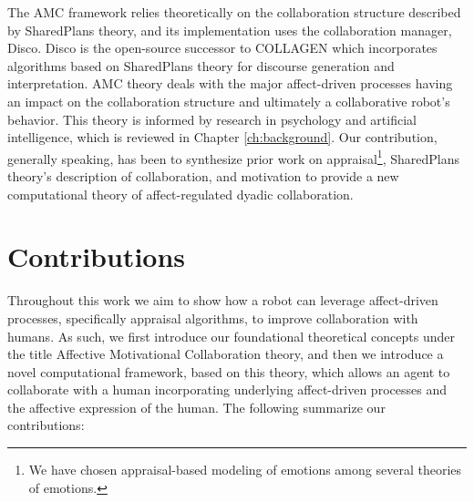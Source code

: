 \documentclass[12pt]{report}
\begin{document}
The AMC framework relies theoretically on the collaboration structure described
by SharedPlans theory, and its implementation uses the collaboration
manager, Disco. Disco is the open-source successor to COLLAGEN
\cite{rich:collaboration-manager,rich:discourse} which incorporates algorithms
based on SharedPlans theory for discourse generation and interpretation. AMC
theory deals with the major affect-driven processes having an impact on the
collaboration structure and ultimately a collaborative robot's behavior. This
theory is informed by research in psychology and artificial intelligence, which
is reviewed in Chapter \ref{ch:background}. Our contribution, generally
speaking, has been to synthesize prior work on appraisal\footnote{We have chosen
appraisal-based modeling of emotions among several theories of emotions.},
SharedPlans theory's description of collaboration, and motivation to provide a
new computational theory of affect-regulated dyadic collaboration.

\section{Contributions}

Throughout this work we aim to show how a robot can leverage affect-driven
processes, specifically appraisal algorithms, to improve collaboration with
humans. As such, we first introduce our foundational theoretical concepts under
the title Affective Motivational Collaboration theory, and then we introduce a
novel computational framework, based on this theory, which allows an agent to
collaborate with a human incorporating underlying affect-driven processes and
the affective expression of the human. The following summarize our
contributions:
\end{document}
